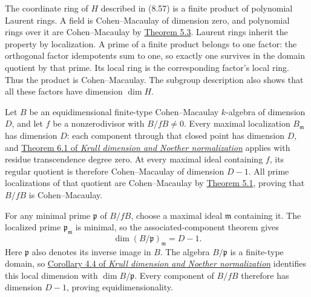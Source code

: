 \documentclass[
  11pt,
  a4paper,
]{article}
\begin{document}
The coordinate ring of \(H\) described in (8.57) is a finite product of
polynomial Laurent rings. A field is Cohen--Macaulay of dimension zero,
and polynomial rings over it are Cohen--Macaulay by
\href{https://kokunoyumeto.github.io/open-math-courses-public/courses/AG-CA/regular-sequences-depth-and-cohen-macaulay-modules.html\#5-localization-and-cohen-macaulay-rings}{Theorem
5.3}. Laurent rings inherit the property by localization. A prime of a
finite product belongs to one factor: the orthogonal factor idempotents
sum to one, so exactly one survives in the domain quotient by that
prime. Its local ring is the corresponding factor's local ring. Thus the
product is Cohen--Macaulay. The subgroup description also shows that all
these factors have dimension \(\dim H\).

Let \(B\) be an equidimensional finite-type Cohen--Macaulay
\(k\)-algebra of dimension \(D\), and let \(f\) be a nonzerodivisor with
\(B/fB\ne0\). Every maximal localization \(B_{\mathfrak m}\) has
dimension \(D\): each component through that closed point has dimension
\(D\), and
\href{https://kokunoyumeto.github.io/open-math-courses-public/courses/AG-CA/krull-dimension-and-noether-normalization.html\#6-dimension-at-a-point}{Theorem
6.1 of \emph{Krull dimension and Noether normalization}} applies with
residue transcendence degree zero. At every maximal ideal containing
\(f\), its regular quotient is therefore Cohen--Macaulay of dimension
\(D-1\). All prime localizations of that quotient are Cohen--Macaulay by
\href{https://kokunoyumeto.github.io/open-math-courses-public/courses/AG-CA/regular-sequences-depth-and-cohen-macaulay-modules.html\#5-localization-and-cohen-macaulay-rings}{Theorem
5.1}, proving that \(B/fB\) is Cohen--Macaulay.

For any minimal prime \(\mathfrak p\) of \(B/fB\), choose a maximal
ideal \(\mathfrak m\) containing it. The localized prime
\(\mathfrak p_{\mathfrak m}\) is minimal, so the associated-component
theorem gives \[
\dim(B/\mathfrak p)_{\mathfrak m}=D-1.
\] Here \(\mathfrak p\) also denotes its inverse image in \(B\). The
algebra \(B/\mathfrak p\) is a finite-type domain, so
\href{https://kokunoyumeto.github.io/open-math-courses-public/courses/AG-CA/krull-dimension-and-noether-normalization.html\#4-parameters-measure-dimension-and-height}{Corollary
4.4 of \emph{Krull dimension and Noether normalization}} identifies this
local dimension with \(\dim B/\mathfrak p\). Every component of \(B/fB\)
therefore has dimension \(D-1\), proving equidimensionality.
\end{document}
